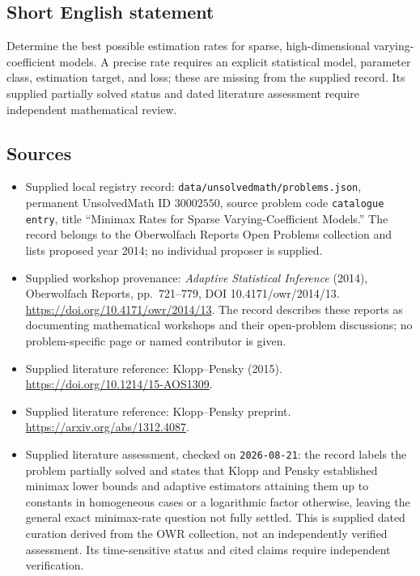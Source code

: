 \documentclass[11pt]{article}
\begin{document}
\subsection{Short English statement}
Determine the best possible estimation rates for sparse, high-dimensional varying-coefficient models. A precise rate requires an explicit statistical model, parameter class, estimation target, and loss; these are missing from the supplied record. Its supplied partially solved status and dated literature assessment require independent mathematical review.
\subsection{Sources}
\begin{itemize}
\item Supplied local registry record: \texttt{data/unsolvedmath/problems.json}, permanent UnsolvedMath ID \(30002550\), source problem code \texttt{catalogue entry}, title ``Minimax Rates for Sparse Varying-Coefficient Models.'' The record belongs to the Oberwolfach Reports Open Problems collection and lists proposed year 2014; no individual proposer is supplied.
\item Supplied workshop provenance: \emph{Adaptive Statistical Inference} (2014), Oberwolfach Reports, pp.~721--779, DOI 10.4171/owr/2014/13. \url{https://doi.org/10.4171/owr/2014/13}. The record describes these reports as documenting mathematical workshops and their open-problem discussions; no problem-specific page or named contributor is given.
\item Supplied literature reference: Klopp--Pensky (2015). \url{https://doi.org/10.1214/15-AOS1309}.
\item Supplied literature reference: Klopp--Pensky preprint. \url{https://arxiv.org/abs/1312.4087}.
\item Supplied literature assessment, checked on \texttt{2026-08-21}: the record labels the problem partially solved and states that Klopp and Pensky established minimax lower bounds and adaptive estimators attaining them up to constants in homogeneous cases or a logarithmic factor otherwise, leaving the general exact minimax-rate question not fully settled. This is supplied dated curation derived from the OWR collection, not an independently verified assessment. Its time-sensitive status and cited claims require independent verification.
\end{itemize}
\end{document}
